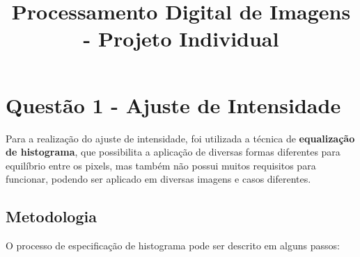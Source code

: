 \documentclass{article}
\title{Processamento Digital de Imagens - Projeto Individual}
\begin{document}
%
\maketitle

%
\section{Questão 1 - Ajuste de Intensidade}
Para a realização do ajuste de intensidade, foi utilizada a técnica de \textbf{equalização de histograma}, que possibilita a aplicação de diversas formas diferentes para equilíbrio entre os pixels, mas também não possui muitos requisitos para funcionar, podendo ser aplicado em diversas imagens e casos diferentes. 

\subsection{Metodologia}
O processo de especificação de histograma pode ser descrito em alguns passos:
\end{document}
